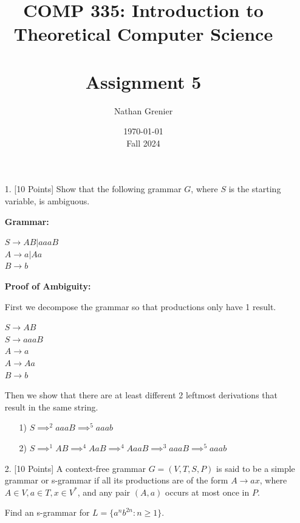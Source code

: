 \documentclass[12pt]{article}
\title{COMP 335: Introduction to Theoretical Computer Science\\
\ \\
Assignment 5}
\author{Nathan Grenier}
\date{\today \\ Fall 2024}
\begin{document}
\begin{spacing}{1.5}
      \maketitle

      \newpage

      \begin{enumerate}

            \item[1.] [10 Points] Show that the following grammar $G$, where $S$ is the starting variable, is ambiguous.

                  \textbf{Grammar:}

                  $S \rightarrow AB | aaaB$ \\
                  $A \rightarrow a | Aa$ \\
                  $B \rightarrow b$

                  \textbf{Proof of Ambiguity:}

                  First we decompose the grammar so that productions only have 1 result.

                  $S \rightarrow AB$ \\
                  $S \rightarrow aaaB$ \\
                  $A \rightarrow a$ \\
                  $A \rightarrow Aa$ \\
                  $B \rightarrow b$

                  Then we show that there are at least different 2 leftmost derivations that result in the same string.

                  \begin{itemize}
                        \item[1)] $S \implies^2 aaaB \implies^5 aaab$
                        \item[2)] $S \implies^1 AB \implies^4 AaB \implies^4 AaaB \implies^3 aaaB \implies^5 aaab$
                  \end{itemize}

                  \newpage
            \item[2.] [10 Points] A context-free grammar $G=(V,T,S,P)$ is said to be a simple grammar or s-grammar if all its productions are of the form $A \rightarrow ax$, where $A \in V, a \in T, x \in V^*$, and any pair $(A,a)$ occurs at most once in $P$.

                  Find an s-grammar for $L=\{a^nb^{2n} : n \geq 1\}$.


\end{enumerate}
\end{spacing}
\end{document}
